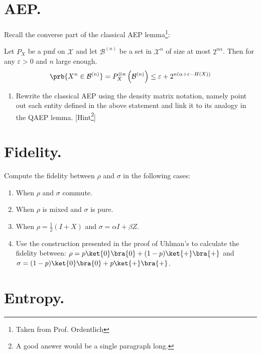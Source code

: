 \documentclass[12pt,a4paper]{article}
\begin{document}
\section{AEP.}
Recall the converse part of the classical AEP lemma\footnote{Taken from Prof. Ordentlich}:
\begin{lemma}
  Let $P_X$ be a pmf on $\mathcal{X}$ and let $\mathcal{B}^{(n)}$ be a set in $\mathcal{X}^n$ of size at most $2^{n\alpha}$. Then for any $\varepsilon > 0$ and $n$ large enough. 
  \begin{equation*}
    \begin{split}
      \prb{X^n \in \mathcal{B}^{(n)}} = P^{\otimes n}_{X}\left( \mathcal{B}^{(n)} \right) \le \varepsilon + 2^{n(\alpha + \varepsilon - H(X))}
    \end{split}
  \end{equation*}
\end{lemma}
\begin{enumerate} 
  \item Rewrite the classical AEP using the density matrix notation, namely point out each entity defined in the above statement and link it to its analogy in the QAEP lemma. [Hint\footnote{A good answer would be a single paragraph long.}]
\end{enumerate}

\section{Fidelity.}
Compute the fidelity between $\rho$ and $\sigma$ in the following cases: 
\begin{enumerate}
  \item When $\rho$ and $\sigma$ commute. 
  \item When $\rho$ is mixed and $\sigma$ is pure.  
  \item When $\rho = \frac{1}{2}\left( I + X \right)$ and $\sigma = \alpha I + \beta Z$.
  \item Use the construction presented in the proof of Uhlman's to calculate the fidelity between: $\rho = p\ket{0}\bra{0} + (1-p)\ket{+}\bra{+}$  and $\sigma = (1-p)\ket{0}\bra{0} + p\ket{+}\bra{+}$. 
\end{enumerate}

\section{Entropy.}
\end{document}

